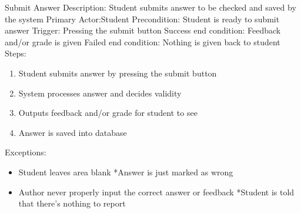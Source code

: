     
    \begin{section}{Submit Answer}
        Description: Student submits answer to be checked and saved by the system \newline
        Primary Actor:Student \newline
        Precondition: Student is ready to submit answer \newline
        Trigger: Pressing the submit button \newline
        Success end condition: Feedback and/or grade is given       \newline
        Failed end condition: Nothing is given back to student      \newline
        \newline
        Steps:
        \begin{enumerate}
            \item{Student submits answer by pressing the submit             button}
            \item{System processes answer and decides validity}
            \item{Outputs feedback and/or grade for student to see}
            \item{Answer is saved into database}
        \end{enumerate}
        Exceptions:
        \begin{itemize}
            \item{Student leaves area blank \newline
        	*Answer is just marked as wrong}
            \item{Author never properly input the correct answer or     feedback \newline
        	*Student is told that there's nothing to report}
        \end{itemize}
    \end{section}

    
     
